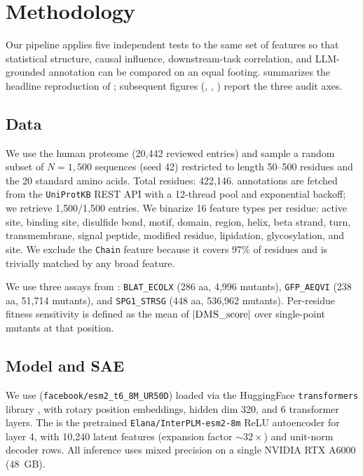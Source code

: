 \section{Methodology}
\label{sec:methodology}

 Our pipeline applies five independent tests to the same set of \sae features so that statistical structure, causal influence, downstream-task correlation, and LLM-grounded annotation can be compared on an equal footing.  summarizes the headline reproduction of \interplm; subsequent figures (, , ) report the three audit axes.

\subsection{Data}

 We use the human \swissprot proteome (20{,}442 reviewed entries) and sample a random subset of $N = 1{,}500$ sequences (seed 42) restricted to length 50--500 residues and the 20 standard amino acids. Total residues: 422{,}146. \swissprot annotations are fetched from the \texttt{UniProtKB} REST API \citep{bateman2023uniprot} with a 12-thread pool and exponential backoff; we retrieve 1{,}500/1{,}500 entries. We binarize 16 feature types per residue: active site, binding site, disulfide bond, motif, domain, region, helix, beta strand, turn, transmembrane, signal peptide, modified residue, lipidation, glycosylation, and site. We exclude the \texttt{Chain} feature because it covers 97\% of residues and is trivially matched by any broad feature.

 We use three \dms assays from \proteingym \citep{notin2023proteingym}: \texttt{BLAT\_ECOLX} (286 aa, 4{,}996 mutants), \texttt{GFP\_AEQVI} (238 aa, 51{,}714 mutants), and \texttt{SPG1\_STRSG} (448 aa, 536{,}962 mutants). Per-residue fitness sensitivity is defined as the mean of $|\textsc{DMS}\text{\_score}|$ over single-point mutants at that position.

\subsection{Model and SAE}

We use \esm (\texttt{facebook/esm2\_t6\_8M\_UR50D}) loaded via the HuggingFace \texttt{transformers} library \citep{wolf2020transformers}, with rotary position embeddings, hidden dim 320, and 6 transformer layers. The \sae is the pretrained \texttt{Elana/InterPLM-esm2-8m} ReLU autoencoder for layer 4, with 10{,}240 latent features (expansion factor $\sim 32\times$) and unit-norm decoder rows. All inference uses mixed precision on a single NVIDIA RTX A6000 (48~GB).

